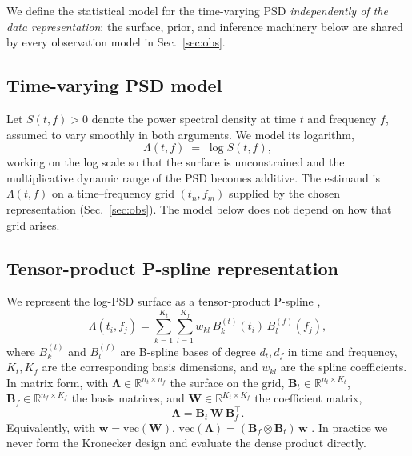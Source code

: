 \documentclass[
  aps,
  prd,
  twocolumn,
  amsmath,
  amssymb,
  nofootinbib,
  superscriptaddress,
  longbibliography,
]{revtex4-2}
\begin{document}
We define the statistical model for the time-varying PSD
\emph{independently of the data representation}: the surface, prior, and
inference machinery below are shared by every observation model in
Sec.~\ref{sec:obs}.

\subsection{Time-varying PSD model}
\label{sec:tvpsd}

Let $S(t,f) > 0$ denote the power spectral density at time $t$ and frequency
$f$, assumed to vary smoothly in both arguments. We model its logarithm,
\begin{equation}
\Lambda(t,f) \;=\; \log S(t,f),
\end{equation}
working on the log scale so that the surface is unconstrained and the
multiplicative dynamic range of the PSD becomes additive. The estimand is
$\Lambda(t,f)$ on a time--frequency grid $(t_n, f_m)$ supplied by the chosen
representation (Sec.~\ref{sec:obs}). The model below does not depend on how that
grid arises.

\subsection{Tensor-product P-spline representation}
\label{sec:pspline}

We represent the log-PSD surface as a tensor-product P-spline
\citep{eilers2003multivariate, wood2017generalized},
\begin{equation}
\Lambda(t_i, f_j) = \sum_{k=1}^{K_t}\sum_{l=1}^{K_f} w_{kl}\,
B_k^{(t)}(t_i)\, B_l^{(f)}(f_j),
\end{equation}
where $B_k^{(t)}$ and $B_l^{(f)}$ are B-spline bases of degree $d_t, d_f$ in
time and frequency, $K_t, K_f$ are the corresponding basis dimensions, and
$w_{kl}$ are the spline coefficients. In matrix form, with
$\bm{\Lambda}\in\mathbb{R}^{n_t\times n_f}$ the surface on the grid,
$\mathbf{B}_t\in\mathbb{R}^{n_t\times K_t}$, $\mathbf{B}_f\in\mathbb{R}^{n_f\times K_f}$
the basis matrices, and $\mathbf{W}\in\mathbb{R}^{K_t\times K_f}$ the coefficient
matrix,
\begin{equation}
\bm{\Lambda} = \mathbf{B}_t\,\mathbf{W}\,\mathbf{B}_f^\top .
\end{equation}
Equivalently, with $\mathbf{w} = \mathrm{vec}(\mathbf{W})$,
$\mathrm{vec}(\bm{\Lambda}) = (\mathbf{B}_f \otimes \mathbf{B}_t)\,\mathbf{w}$
\citep{boer2023tensor}. In practice we never form the Kronecker design and
evaluate the dense product directly.
\end{document}
